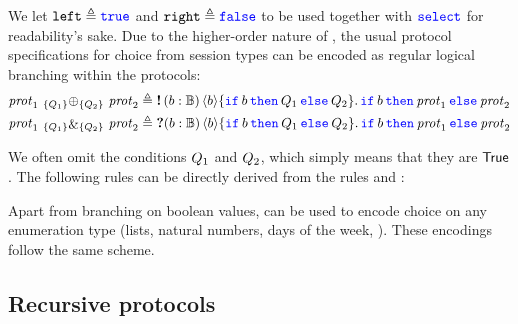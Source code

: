 \noindent
We let $\mathtt{left} \triangleq \texttt{\color{blue} true}$ and $\mathtt{right} \triangleq \texttt{\color{blue} false}$ to be used
together with $\texttt{\color{blue} select}$ for readability's sake.
Due to the higher-order nature of \lname, the usual protocol specifications for
choice from session types can be encoded as regular logical branching within
the protocols:
\begin{align*}
\selectprotprop{\prot_1}{\ipropB_1}{\ipropB_2}{\prot_2} \eqdef{}&
  \sendprot {(b:\bool)} b {\If b then \ipropB_1 \Else \ipropB_2}
                {\If b then \prot_1 \Else \prot_2} \\
\branchprotprop{\prot_1}{\ipropB_1}{\ipropB_2}{\prot_2} \eqdef{}&
  \recvprot {(b:\bool)} b {\If b then \ipropB_1 \Else \ipropB_2}
                {\If b then \prot_1 \Else \prot_2}
\end{align*}

\noindent
We often omit the conditions $Q_1$ and $Q_2$, which simply means
that they are $\textsf{\upshape True}$.
The following rules can be directly derived from the rules
 and :
%

\noindent
Apart from branching on boolean values, \pname can be used to encode
choice on any enumeration type (\eg lists, natural numbers, days of the
week, \etc).
These encodings follow the same scheme.

\subsection{Recursive protocols}
\label{sec:rec}


